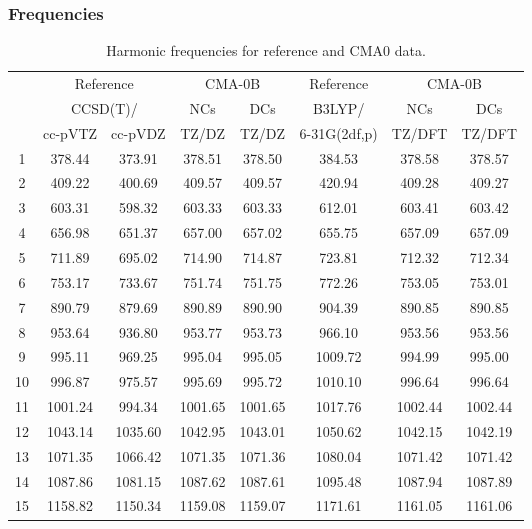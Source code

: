 \documentclass[10pt,oneside]{article}
\begin{document}
\subsubsection*{Frequencies}
\begin{table}[h!]
\centering
\caption{Harmonic frequencies for reference and CMA0 data.}
\begin{tabular}{cccccccc}
\toprule
{} & \multicolumn{2}{c}{Reference} & \multicolumn{2}{c}{CMA-0B} &    Reference & \multicolumn{2}{c}{CMA-0B} \\
{} & \multicolumn{2}{c}{CCSD(T)/} &     NCs &     DCs &       B3LYP/ &     NCs &     DCs \\
{} &   cc-pVTZ & cc-pVDZ &   TZ/DZ &   TZ/DZ & 6-31G(2df,p) &  TZ/DFT &  TZ/DFT \\
\midrule
1  &    378.44 &  373.91 &  378.51 &  378.50 &       384.53 &  378.58 &  378.57 \\
2  &    409.22 &  400.69 &  409.57 &  409.57 &       420.94 &  409.28 &  409.27 \\
3  &    603.31 &  598.32 &  603.33 &  603.33 &       612.01 &  603.41 &  603.42 \\
4  &    656.98 &  651.37 &  657.00 &  657.02 &       655.75 &  657.09 &  657.09 \\
5  &    711.89 &  695.02 &  714.90 &  714.87 &       723.81 &  712.32 &  712.34 \\
6  &    753.17 &  733.67 &  751.74 &  751.75 &       772.26 &  753.05 &  753.01 \\
7  &    890.79 &  879.69 &  890.89 &  890.90 &       904.39 &  890.85 &  890.85 \\
8  &    953.64 &  936.80 &  953.77 &  953.73 &       966.10 &  953.56 &  953.56 \\
9  &    995.11 &  969.25 &  995.04 &  995.05 &      1009.72 &  994.99 &  995.00 \\
10 &    996.87 &  975.57 &  995.69 &  995.72 &      1010.10 &  996.64 &  996.64 \\
11 &   1001.24 &  994.34 & 1001.65 & 1001.65 &      1017.76 & 1002.44 & 1002.44 \\
12 &   1043.14 & 1035.60 & 1042.95 & 1043.01 &      1050.62 & 1042.15 & 1042.19 \\
13 &   1071.35 & 1066.42 & 1071.35 & 1071.36 &      1080.04 & 1071.42 & 1071.42 \\
14 &   1087.86 & 1081.15 & 1087.62 & 1087.61 &      1095.48 & 1087.94 & 1087.89 \\
15 &   1158.82 & 1150.34 & 1159.08 & 1159.07 &      1171.61 & 1161.05 & 1161.06 \\

\end{tabular}
\end{table}
\end{document}
